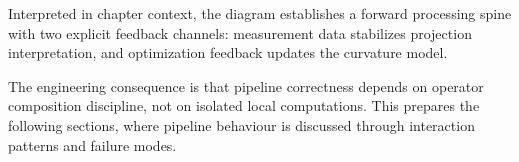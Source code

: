 Interpreted in chapter context, the diagram establishes a forward
processing spine with two explicit feedback channels: measurement data
stabilizes projection interpretation, and optimization feedback updates
the curvature model.

The engineering consequence is that pipeline correctness depends on
operator composition discipline, not on isolated local computations.
This prepares the following sections, where pipeline behaviour is
discussed through interaction patterns and failure modes.
